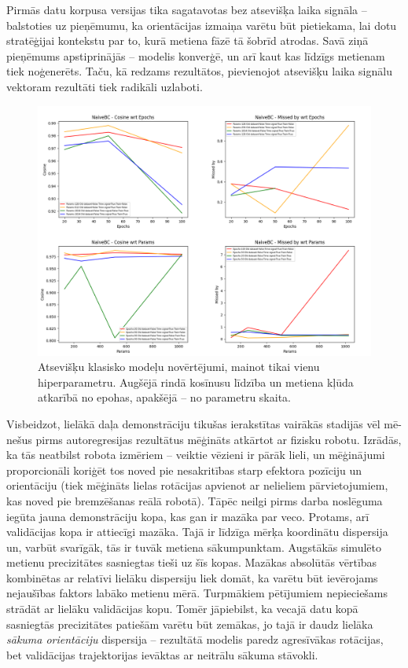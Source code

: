 \documentclass[12pt, a4paper]{article}
\numberwithin{equation}{section} %
\begin{document}
Pirmās datu korpusa versijas tika sagatavotas bez atsevišķa laika signāla -- balstoties uz pieņēmumu, ka orientācijas izmaiņa varētu būt pietiekama, lai dotu stratēģijai kontekstu par to, kurā metiena fāzē tā šobrīd atrodas. Savā ziņā pieņēmums apstiprinājās -- modelis konverģē, un arī kaut kas līdzīgs metienam tiek noģenerēts. Taču, kā redzams rezultātos, pievienojot atsevišķu laika signālu vektoram rezultāti tiek radikāli uzlaboti.



\begin{figure}[t!]
    \centering
    \includegraphics[width=16cm,page=1]{../img/naivebc-independent-params-epoch.png}
    \caption{Atsevišķu klasisko modeļu novērtējumi, mainot tikai vienu hiperparametru. Augšējā rindā kosīnusu līdzība un metiena kļūda atkarībā no epohas, apakšējā -- no parametru skaita.}
\end{figure}


Visbeidzot, lielākā daļa demonstrāciju tikušas ierakstītas vairākās stadijās vēl mē-nešus pirms autoregresijas rezultātus mēģināts atkārtot ar fizisku robotu. Izrādās, ka tās neatbilst robota izmēriem -- veiktie vēzieni ir pārāk lieli, un mēģinājumi proporcionāli koriģēt tos noved pie nesakritības starp efektora pozīciju un orientāciju (tiek mēģināts lielas rotācijas apvienot ar nelieliem pārvietojumiem, kas noved pie bremzēšanas reālā robotā). Tāpēc neilgi pirms darba noslēguma iegūta jauna demonstrāciju kopa, kas gan ir mazāka par veco. Protams, arī validācijas kopa ir attiecīgi mazāka.  Tajā ir līdzīga mērķa koordinātu dispersija un, varbūt svarīgāk, tās ir tuvāk metiena sākumpunktam. Augstākās simulēto metienu precizitātes sasniegtas tieši uz šīs kopas. Mazākas absolūtās vērtības kombinētas ar relatīvi lielāku dispersiju liek domāt, ka varētu būt ievērojams nejaušības faktors labāko metienu mērā. Turpmākiem pētījumiem nepieciešams strādāt ar lielāku validācijas kopu. Tomēr jāpiebilst, ka vecajā datu kopā sasniegtās precizitātes patiešām varētu būt zemākas, jo tajā ir daudz lielāka \textit{sākuma orientāciju} dispersija -- rezultātā modelis paredz agresīvākas rotācijas, bet validācijas trajektorijas ievāktas ar neitrālu sākuma stāvokli.
\end{document}
